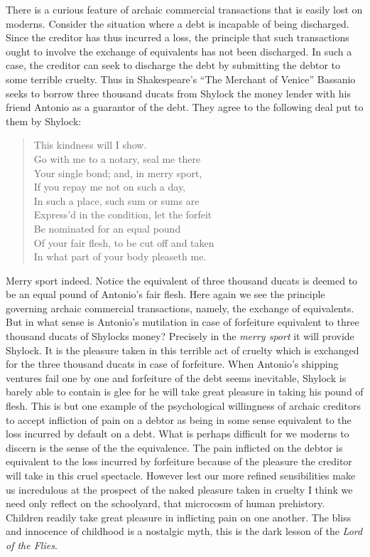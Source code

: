 There is a curious feature of archaic commercial transactions that is easily lost on moderns. Consider the situation where a debt is incapable of being discharged. Since the creditor has thus incurred a loss, the principle that such transactions ought to involve the exchange of equivalents has not been discharged. In such a case, the creditor can seek to discharge the debt by submitting the debtor to some terrible cruelty. Thus in Shakespeare's
``The Merchant of Venice'' Bassanio seeks to borrow three thousand ducats from Shylock the money lender with his friend Antonio as a guarantor of the debt. They agree to the following deal put to them by Shylock:
\begin{verse}
	This kindness will I show.\\
	Go with me to a notary, seal me there\\
	Your single bond; and, in merry sport,\\
	If you repay me not on such a day,\\
	In such a place, such sum or sums are\\ 
	Express'd in the condition, let the forfeit\\
	Be nominated for an equal pound\\
	Of your fair flesh, to be cut off and taken\\
	In what part of your body pleaseth me.\\
\end{verse}
Merry sport indeed. Notice the equivalent of three thousand ducats is deemed to be an equal pound of Antonio's fair flesh. Here again we see the principle governing archaic commercial transactions, namely, the exchange of equivalents. But in what sense is Antonio's mutilation in case of forfeiture equivalent to three thousand ducats of Shylocks money? Precisely in the \emph{merry sport} it will provide Shylock. It is the pleasure taken in this terrible act of cruelty which is exchanged for the three thousand ducats in case of forfeiture. When Antonio's shipping ventures fail one by one and forfeiture of the debt seems inevitable, Shylock is barely able to contain is glee for he will take great pleasure in taking his pound of flesh. This is but one example of the psychological willingness of archaic creditors to accept infliction of pain on a debtor as being in some sense equivalent to the loss incurred by default on a debt. What is perhaps difficult for we moderns to discern is the sense of the the equivalence. The pain inflicted on the debtor is equivalent to the loss incurred by forfeiture because of the pleasure the creditor will take in this cruel spectacle. However lest our more refined sensibilities make us incredulous at the prospect of the naked pleasure taken in cruelty I think we need only reflect on the schoolyard, that microcosm of human prehistory. Children readily take great pleasure in inflicting pain on one another. The bliss and innocence of childhood is a nostalgic myth, this is the dark lesson of the \emph{Lord of the Flies}. \change

